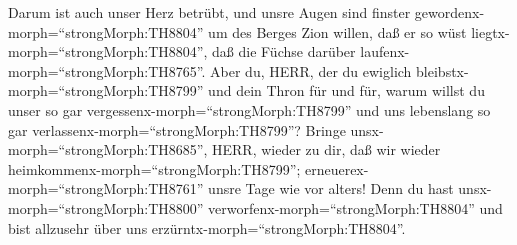  Darum ist auch unser Herz betrübt, und unsre Augen sind
finster gewordenx-morph=``strongMorph:TH8804''  um des
Berges Zion willen, daß er so wüst liegtx-morph=``strongMorph:TH8804'',
daß die Füchse darüber laufenx-morph=``strongMorph:TH8765''.
 Aber du, HERR, der du ewiglich
bleibstx-morph=``strongMorph:TH8799'' und dein Thron für und für,
 warum willst du unser so gar
vergessenx-morph=``strongMorph:TH8799'' und uns lebenslang so gar
verlassenx-morph=``strongMorph:TH8799''?  Bringe
unsx-morph=``strongMorph:TH8685'', HERR, wieder zu dir, daß wir wieder
heimkommenx-morph=``strongMorph:TH8799'';
erneuerex-morph=``strongMorph:TH8761'' unsre Tage wie vor alters!
 Denn du hast unsx-morph=``strongMorph:TH8800''
verworfenx-morph=``strongMorph:TH8804'' und bist allzusehr über uns
erzürntx-morph=``strongMorph:TH8804''.

